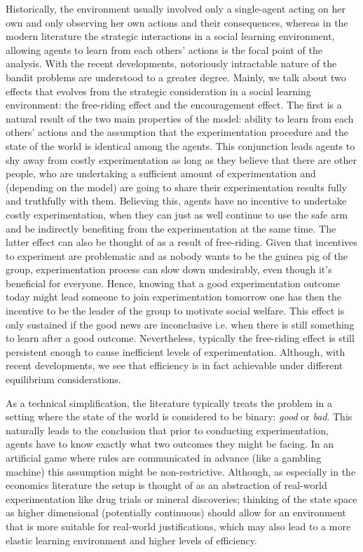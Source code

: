 Historically, the environment usually involved only a single-agent acting on her own and only observing her own actions and their consequences, whereas in the modern literature the strategic interactions in a social learning environment, allowing agents to learn from each others' actions is the focal point of the analysis. With the recent developments, notoriously intractable nature of the bandit problems are understood to a greater degree. Mainly, we talk about two effects that evolves from the strategic consideration in a social learning environment: the free-riding effect and the encouragement effect. The first is a natural result of the two main properties of the model: ability to learn from each others' actions and the assumption that the experimentation procedure and the state of the world is identical among the agents. This conjunction leads agents to shy away from costly experimentation as long as they believe that there are other people, who are undertaking a sufficient amount of experimentation and (depending on the model) are going to share their experimentation results fully and truthfully with them. Believing this, agents have no incentive to undertake costly experimentation, when they can just as well continue to use the safe arm and be indirectly benefiting from the experimentation at the same time. The latter effect can also be thought of as a result of free-riding. Given that incentives to experiment are problematic and as nobody wants to be the guinea pig of the group, experimentation process can slow down undesirably, even though it's beneficial for everyone. Hence, knowing that a good experimentation outcome today might lead someone to join experimentation tomorrow one has then the incentive to be the leader of the group to motivate social welfare. This effect is only sustained if the good news are inconclusive i.e. when there is still something to learn after a good outcome. Nevertheless, typically the free-riding effect is still persistent enough to cause inefficient levels of experimentation. Although, with recent developments, we see that efficiency is in fact achievable under different equilibrium considerations.

As a technical simplification, the literature typically treats the problem in a setting where the state of the world is considered to be binary: \textit{good} or \textit{bad}. This naturally leads to the conclusion that prior to conducting experimentation, agents have to know exactly what two outcomes they might be facing. In an artificial game where rules are communicated in advance (like a gambling machine) this assumption might be non-restrictive. Although, as especially in the economics literature the setup is thought of as an abstraction of real-world experimentation like drug trials or mineral discoveries; thinking of the state space as higher dimensional (potentially continuous) should allow for an environment that is more suitable for real-world justifications, which may also lead to a more elastic learning environment and higher levels of efficiency. 

